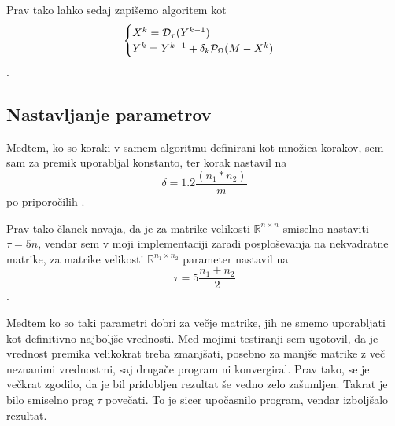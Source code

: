 Prav tako lahko sedaj zapišemo algoritem kot
\[
    \begin{cases}
        X^k = \mathcal{D}_\tau(Y^{k-1}) \\
        Y^k = Y^{k-1} + \delta_k \mathcal{P}_\Omega(M - X^k) 
    \end{cases}
\] \cite{CCS}.

\subsection{Nastavljanje parametrov}
Medtem, ko so koraki v samem algoritmu definirani kot množica korakov, 
sem sam za premik uporabljal konstanto, ter korak nastavil na 
\[\delta = 1.2\frac{(n_1 * n_2)}{m}\] po priporočilih \cite{CCS}. 

Prav tako članek navaja, da je za matrike velikosti $\mathbb{R}^{n \times n}$ smiselno nastaviti $\tau = 5n$, vendar sem v moji implementaciji zaradi posploševanja na nekvadratne matrike, za matrike velikosti $\mathbb{R}^{n_1 \times n_2}$ parameter nastavil na
\[
    \tau = 5 \frac{n_1+n_2}{2}
\].

Medtem ko so taki parametri dobri za večje matrike, jih ne smemo uporabljati kot definitivno najboljše vrednosti. Med mojimi testiranji sem ugotovil, da je vrednost premika velikokrat treba zmanjšati, posebno za manjše matrike z več neznanimi vrednostmi, saj drugače program ni konvergiral. Prav tako, se je večkrat zgodilo, da je bil pridobljen rezultat še vedno zelo zašumljen. Takrat je bilo smiselno prag $\tau$ povečati. To je sicer upočasnilo program, vendar izboljšalo rezultat.